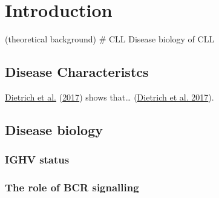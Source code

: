 \documentclass[11pt, a4paper, twosided]{book}
\begin{document}
\begin{tabular}{rp{0.2cm}lp{1cm}rp{0.2cm}l}
    
   
\end{tabular}
\newpage
\listoffigures
{}

\newpage
\listoftables
{}

\newpage
\pagestyle{plain}
\setcounter{page}{1}    %

\hypertarget{introduction}{%
\chapter{Introduction}\label{introduction}}

(theoretical background)
\# CLL Disease biology of CLL

\hypertarget{disease-characteristcs}{%
\section{Disease Characteristcs}\label{disease-characteristcs}}

\protect\hyperlink{ref-JCIpaper}{Dietrich et al.} (\protect\hyperlink{ref-JCIpaper}{2017}) shows that\ldots{} (\protect\hyperlink{ref-JCIpaper}{Dietrich et al. 2017}).

\hypertarget{disease-biology}{%
\section{Disease biology}\label{disease-biology}}

\hypertarget{ighv-status}{%
\subsection{IGHV status}\label{ighv-status}}

\hypertarget{the-role-of-bcr-signalling}{%
\subsection{The role of BCR signalling}\label{the-role-of-bcr-signalling}}
\end{document}
